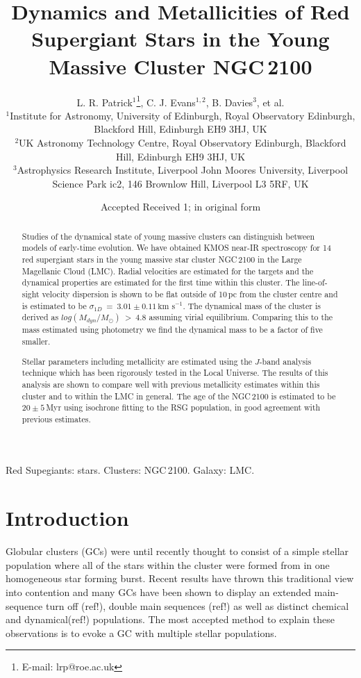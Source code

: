 \documentclass[useAMS,usenatbib]{mn2e}
\title[Dynamics and Metallicities in NGC\,2100]{Dynamics and Metallicities of Red Supergiant Stars in the Young Massive Cluster NGC\,2100}
\author[L. R. Patrick et al.]{L. R. Patrick$^{1}$\thanks{E-mail: lrp@roe.ac.uk}, C. J. Evans$^{1, 2}$, B. Davies$^{3}$, et al.\\
$^{1}$Institute for Astronomy, University of Edinburgh, Royal Observatory Edinburgh, Blackford Hill, Edinburgh EH9 3HJ, UK\\
$^{2}$UK Astronomy Technology Centre, Royal Observatory Edinburgh, Blackford Hill, Edinburgh EH9 3HJ, UK\\
$^{3}$Astrophysics Research Institute, Liverpool John Moores University, Liverpool Science Park ic2, 146 Brownlow Hill, Liverpool L3 5RF, UK
}
\def\kms{$\mbox{km s}^{-1}$}
\begin{document}
\date{Accepted  Received 1; in original form}

\pagerange{\pageref{firstpage}--\pageref{lastpage}} 

\maketitle

\label{firstpage}

\begin{abstract}
Studies of the dynamical state of young massive clusters can distinguish between models of early-time evolution.
We have obtained KMOS near-IR spectroscopy for 14 red supergiant stars in the young massive star cluster NGC\,2100 in the Large Magellanic Cloud (LMC).
Radial velocities are estimated for the targets and the dynamical properties are estimated for the first time within this cluster.
The line-of-sight velocity dispersion is shown to be flat outside of 10\,pc from the cluster centre and is estimated to be
$\sigma_{1D}~=~3.01\pm0.11\,$\kms.
The dynamical mass of the cluster is derived as
$log(M_{dyn}/M_{\odot})~>~4.8$ assuming virial equilibrium.
Comparing this to the mass estimated using photometry we find the dynamical mass to be a factor of five smaller.

Stellar parameters including metallicity are estimated using the $J$-band analysis technique which has been rigorously tested in the Local Universe.
The results of this analysis are shown to compare well with previous metallicity estimates within this cluster and to within the LMC in general.
The age of the NGC\,2100 is estimated to be $20\pm5\,$Myr using isochrone fitting to the RSG population, in good agreement with previous estimates.

\end{abstract}

\begin{keywords}
Red Supegiants: stars. Clusters: NGC\,2100. Galaxy: LMC.
\end{keywords}

\section{Introduction} %
\label{sec:introduction}

Globular clusters (GCs) were until recently thought to consist of a simple stellar population where all of the stars within the cluster were formed from in one homogeneous star forming burst.
Recent results have thrown this traditional view into contention and many GCs have been shown to display an extended main-sequence turn off (ref!), double main sequences (ref!) as well as distinct chemical~\citep{2012A&A...539A..19G} and dynamical(ref!) populations.
The most accepted method to explain these observations is to evoke a GC with multiple stellar populations.
\end{document}
